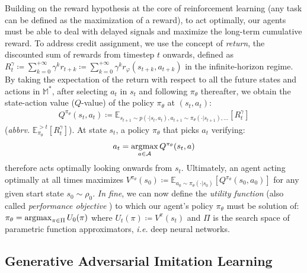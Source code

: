 Building on the reward hypothesis at the core of reinforcement learning (any task
can be defined as the maximization of a reward), to act optimally, our agents
must be able to deal with delayed signals and maximize the long-term cumulative reward.
To address credit assignment, we use the concept of \emph{return},
the discounted sum of rewards from timestep $t$ onwards, defined as
$R_t^\gamma
\coloneqq \sum_{k=0}^{+\infty} \gamma^k r_{t+k}
\coloneqq \sum_{k=0}^{+\infty} \gamma^k r_\varphi(s_{t+k}, a_{t+k})$
in the infinite-horizon regime.
By taking the expectation of the return
with respect to all the future states and actions in $\mathbb{M}^*$,
after selecting $a_t$ in $s_t$ and following $\pi_\theta$ thereafter,
we obtain the state-action value ($Q$-value) of the policy $\pi_\theta$ at $(s_t, a_t)$:
\begin{align}
Q^{\pi_\theta}(s_t, a_t) \coloneqq
\mathbb{E}_{
s_{t+1} \sim p(\cdot | s_t, a_t),
a_{t+1} \sim \pi_\theta(\cdot | s_{t+1}), \ldots}
[R_t^\gamma]
\end{align}
(\textit{abbrv.} $\mathbb{E}_{\pi_\theta}^{>t}[R_t^\gamma]$).
At state $s_t$, a policy $\pi_\theta$ that picks $a_t$ verifying:
\[a_t = \operatorname*{\arg\!\max}_{a \in \mathcal{A}} Q^{\pi_\theta} (s_t, a)\]
therefore acts optimally looking onwards from $s_t$.
Ultimately, an agent acting optimally at all times maximizes
$V^{\pi_\theta} (s_0)
\coloneqq \mathbb{E}_{a_0 \sim \pi_\theta(\cdot | s_0)}[Q^{\pi_\theta}(s_0, a_0)]$
for any given start state $s_0 \sim \rho_0$.
\textit{In fine}, we can now define the \emph{utility function}
(also called \emph{performance objective} \cite{Silver2014-dk}) to which
our agent's policy $\pi_\theta$ must be solution of:
$\pi_\theta = \operatorname*{\arg\!\max}_{\pi \in \Pi} U_0(\pi)$ where $U_t(\pi) \coloneqq V^\pi(s_t)$
and $\Pi$ is the search space of parametric function approximators,
\textit{i.e.} deep neural networks.

\subsection*{Generative Adversarial Imitation Learning}
\label{gail}


